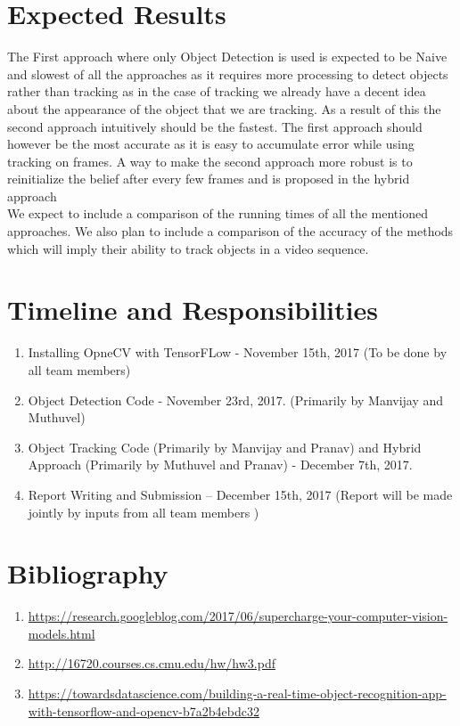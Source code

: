 \documentclass[a4paper,man,natbib]{apa6}
\begin{document}
\section{Expected Results}

The First approach where only Object Detection is used is expected to be Naive and slowest of all the approaches as it requires more processing to detect objects rather than tracking as in the case of tracking we already have a decent idea about the appearance of the object that we are tracking. As a result of this the second approach intuitively should be the fastest. The first approach should however be the most accurate as it is easy to accumulate error while using tracking on frames. A way to make the second approach more robust is to reinitialize the belief after every few frames and is proposed in the hybrid approach
\\
We expect to include a comparison of the running times of all the mentioned approaches. We also plan to include a comparison of the accuracy of the methods which will imply their ability to track objects in a video sequence. 
\section{Timeline and Responsibilities}
\begin{enumerate}
\item Installing OpneCV with TensorFLow - November 15th, 2017
{\small(To be done by all team members)}
\item Object Detection Code - November 23rd, 2017. {\small(Primarily by Manvijay and Muthuvel)}

\item Object Tracking Code {\small(Primarily by Manvijay and Pranav)} and Hybrid Approach {\small(Primarily by Muthuvel and Pranav)} - December 7th, 2017. 
\item Report Writing and Submission – December 15th, 2017   {\small(Report will be made jointly by inputs from all team members )}                      	 	 
 

\end{enumerate} 
\section{Bibliography}
\begin{enumerate}
\item  \url{https://research.googleblog.com/2017/06/supercharge-your-computer-vision-models.html}
\item \url {http://16720.courses.cs.cmu.edu/hw/hw3.pdf}
\item \url{https://towardsdatascience.com/building-a-real-time-object-recognition-app-with-tensorflow-and-opencv-b7a2b4ebdc32}
\end{enumerate}
\end{document}
